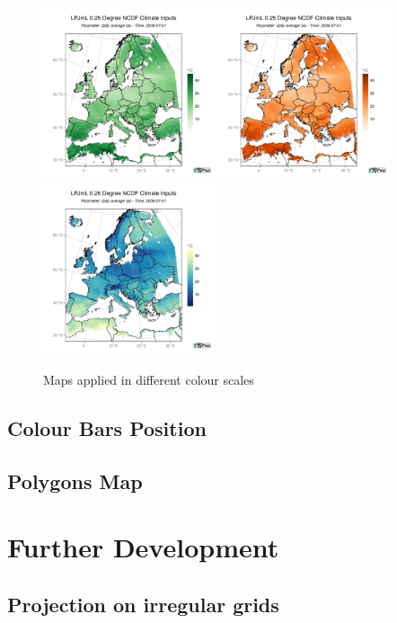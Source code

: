 \documentclass[a4paper,10pt]{article}
\begin{document}
\begin{figure}
  \includegraphics[width=0.45\textwidth, height=0.45\textwidth]{col_12}
  \includegraphics[width=0.45\textwidth, height=0.45\textwidth]{col_13}
  \includegraphics[width=0.45\textwidth, height=0.45\textwidth]{col_15}
    \caption{Maps applied in different colour scales}
  \label{fig:change color}
\end{figure}

\subsection{Colour Bars Position}
\subsection{Polygons Map}
\section{Further Development}
\subsection{Projection on irregular grids}
\end{document}
